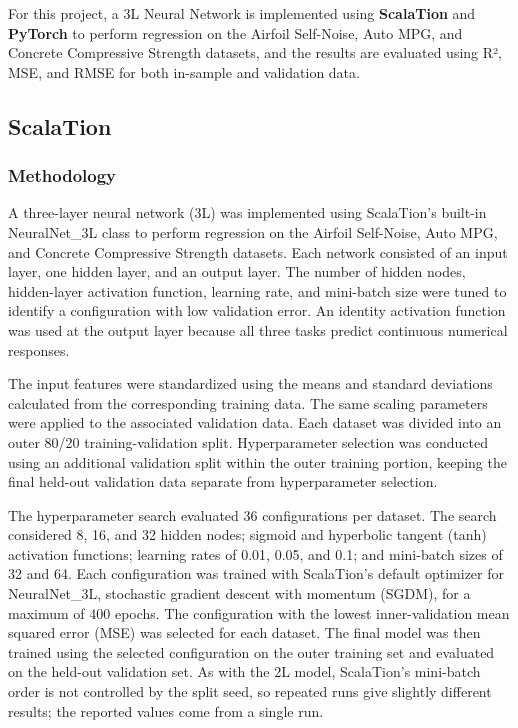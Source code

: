 \documentclass{article}
\begin{document}
For this project, a 3L Neural Network is implemented using \textbf{ScalaTion} and \textbf{PyTorch} to perform regression on the Airfoil Self-Noise, Auto MPG, and Concrete Compressive Strength datasets, and the results are evaluated using R², MSE, and RMSE for both in-sample and validation data.

\subsection{ScalaTion}

\subsubsection{Methodology}
A three-layer neural network (3L) was implemented using ScalaTion's built-in NeuralNet\_3L class to perform regression on the Airfoil Self-Noise, Auto MPG, and Concrete Compressive Strength datasets. Each network consisted of an input layer, one hidden layer, and an output layer. The number of hidden nodes, hidden-layer activation function, learning rate, and mini-batch size were tuned to identify a configuration with low validation error. An identity activation function was used at the output layer because all three tasks predict continuous numerical responses.
\medskip

The input features were standardized using the means and standard deviations calculated from the corresponding training data. The same scaling parameters were applied to the associated validation data. Each dataset was divided into an outer 80/20 training-validation split. Hyperparameter selection was conducted using an additional validation split within the outer training portion, keeping the final held-out validation data separate from hyperparameter selection.
\medskip

The hyperparameter search evaluated 36 configurations per dataset. The search considered 8, 16, and 32 hidden nodes; sigmoid and hyperbolic tangent (tanh) activation functions; learning rates of 0.01, 0.05, and 0.1; and mini-batch sizes of 32 and 64. Each configuration was trained with ScalaTion's default optimizer for NeuralNet\_3L, stochastic gradient descent with momentum (SGDM), for a maximum of 400 epochs. The configuration with the lowest inner-validation mean squared error (MSE) was selected for each dataset. The final model was then trained using the selected configuration on the outer training set and evaluated on the held-out validation set. As with the 2L model, ScalaTion's mini-batch order is not controlled by the split seed, so repeated runs give slightly different results; the reported values come from a single run.
\end{document}
